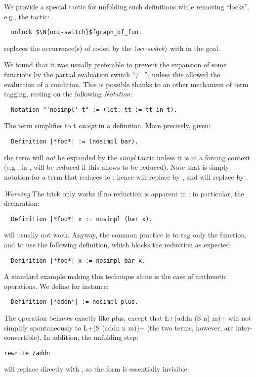 We provide a special tactic  for unfolding such definitions
while removing ``locks'', e.g., the tactic:
\begin{lstlisting}
  unlock $\N{occ-switch}$fgraph_of_fun.
\end{lstlisting}
replaces the occurrence(s) of  coded by the $\langle\mbox{\itshape\rmfamily\small occ-switch}\rangle$
with  in the goal.

We found that it was usually preferable to prevent the expansion of
some functions by the partial evaluation switch ``/='', unless
this allowed the evaluation of a condition. This is possible thanks to
an other mechanism of term tagging, resting on the following
\emph{Notation}:
\begin{lstlisting}
  Notation "'nosimpl' t" := (let: tt := tt in t).
\end{lstlisting}

The term  simplifies to t \emph{except} in a
definition. More precisely,
given:
\begin{lstlisting}
  Definition |*foo*| := (nosimpl bar).
\end{lstlisting}
the term  will \emph{not} be expanded by the
\emph{simpl} tactic unless it is in a forcing context (e.g., in
,  will be reduced if this allows
 to be reduced). Note that  is simply notation
for a term that reduces to ; hence  will replace
     by , and  will replace  by
    .

\emph{Warning} The  trick only works if no reduction is
apparent in ; in particular, the declaration:
\begin{lstlisting}
  Definition |*foo*| x := nosimpl (bar x).
\end{lstlisting}
will usually not work. Anyway, the common practice is to tag only the
function, and to use the following definition, which blocks the
reduction as expected:
\begin{lstlisting}
  Definition |*foo*| x := nosimpl bar x.
\end{lstlisting}


A standard example making this technique shine is the case of
arithmetic operations. We define for instance:
\begin{lstlisting}
  Definition |*addn*| := nosimpl plus.
\end{lstlisting}
The operation  behaves exactly like plus, except that
\L+(addn (S n) m)+ will not
simplify spontaneously to \L+(S (addn n m))+ (the two terms, however, are
inter-convertible). In addition, the unfolding step:
\begin{lstlisting}
rewrite /addn
\end{lstlisting}
will replace  directly with , so the  form
is essentially invisible.

